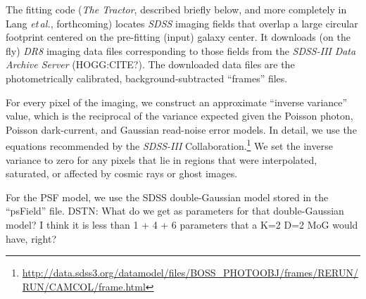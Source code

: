 \documentclass[12pt,preprint,pdftex]{aastex}
\newcommand{\project}[1]{\textsl{#1}}
\newcommand{\foreign}[1]{\emph{#1}}
\newcommand{\etal}{\foreign{et\,al.}}
\begin{document}
The fitting code (\project{The Tractor}, described briefly below, and
more completely in Lang \etal, forthcoming) locates \project{SDSS}
imaging fields that overlap a large circular footprint centered on the
pre-fitting (input) galaxy center.  It downloads (on the fly)
\project{DR8} imaging data files corresponding to those fields from
the \project{SDSS-III} \project{Data Archive Server} (HOGG:CITE?).  The
downloaded data files are the photometrically calibrated,
background-subtracted ``frames'' files.

For every pixel of the imaging, we construct an approximate ``inverse
variance'' value, which is the reciprocal of the variance expected
given the Poisson photon, Poisson dark-current, and Gaussian
read-noise error models.  In detail, we use the equations recommended
by the \project{SDSS-III}
Collaboration.\footnote{\url{http://data.sdss3.org/datamodel/files/BOSS\_PHOTOOBJ/frames/RERUN/RUN/CAMCOL/frame.html}}
We set the inverse variance to zero for any pixels that lie in regions
that were interpolated, saturated, or affected by cosmic rays or ghost
images.

For the PSF model, we use the SDSS double-Gaussian model stored in the
``psField'' file.  DSTN: What do we get as parameters for that
double-Gaussian model?  I think it is less than 1 + 4 + 6 parameters
that a K=2 D=2 MoG would have, right?
\end{document}
